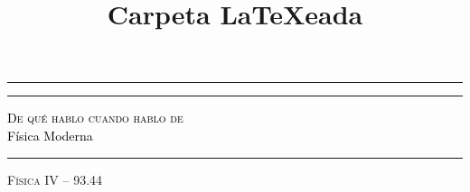 \documentclass[10pt,twocolumn,titlepage]{article}
\title{Carpeta LaTeXeada}
\begin{document}
\begin{titlepage} %

%


    \selectfont %
    \BgThispage
    
    
	\centering %
	
	
	\rule{\textwidth}{1pt} %
	
	\vspace{2pt}\vspace{-\baselineskip} %
	
	\rule{\textwidth}{0.4pt} %
	
	\vspace{0.1\textheight} %
	
	
	\textcolor{black}{ %
		{\Large\scshape De qué hablo cuando hablo de}\\[1.5\baselineskip] %
		{\Huge Física Moderna} %
	}
	
	\vspace{0.025\textheight} %
	
	\rule{0.3\textwidth}{0.4pt} %
	
	\vspace{0.1\textheight} %
	
	
	{\Large \textsc{Física IV -- 93.44}} %
	\vspace{3cm}
    


\end{titlepage}
\end{document}
